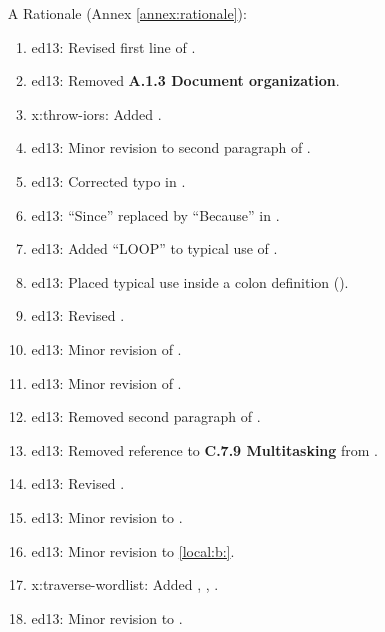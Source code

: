 \begin{itemize}
	\item[A] Rationale (Annex \ref{annex:rationale}):				%
		\begin{enumerate}
		\item \textsf{ed13}: Revised first line of .
		\item \textsf{ed13}: Removed \textbf{A.1.3 Document organization}.
		\item \textsf{x:throw-iors}: Added .
		\item \textsf{ed13}: Minor revision to second paragraph of .
		\item \textsf{ed13}: Corrected typo in .
		\item \textsf{ed13}: ``Since'' replaced by ``Because'' in .
		\item \textsf{ed13}: Added ``LOOP'' to typical use of .
		\item \textsf{ed13}: Placed typical use inside a colon definition ().
		\item \textsf{ed13}: Revised .
		\item \textsf{ed13}: Minor revision of .
		\item \textsf{ed13}: Minor revision of .
		\item \textsf{ed13}: Removed second paragraph of .
		\item \textsf{ed13}: Removed reference to \textbf{C.7.9 Multitasking} from .

		\item \textsf{ed13}: Revised .

		\item \textsf{ed13}: Minor revision to .

		\item \textsf{ed13}: Minor revision to \ref{local:b:}{}.

		\item \textsf{x:traverse-wordlist}:
			Added ,
			,
			.

		\item \textsf{ed13}: Minor revision to .
		\end{enumerate}


\end{itemize}
